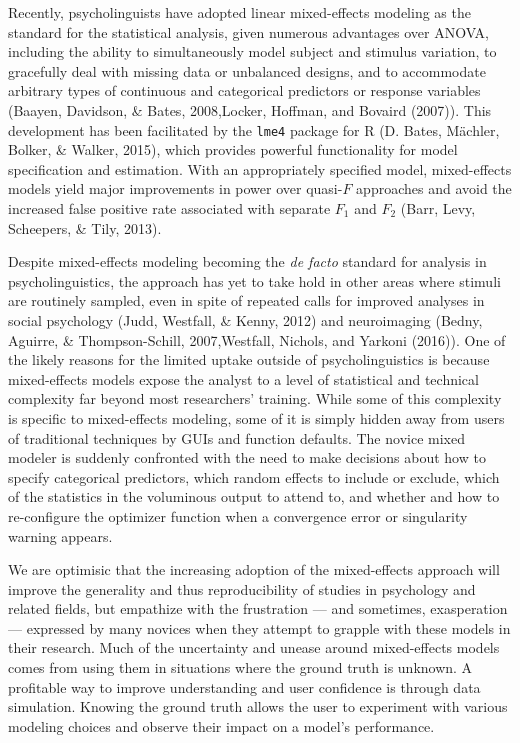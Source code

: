 \documentclass[man,floatsintext]{apa6}
\begin{document}
Recently, psycholinguists have adopted linear mixed-effects modeling as
the standard for the statistical analysis, given numerous advantages
over ANOVA, including the ability to simultaneously model subject and
stimulus variation, to gracefully deal with missing data or unbalanced
designs, and to accommodate arbitrary types of continuous and
categorical predictors or response variables (Baayen, Davidson, \&
Bates, 2008,Locker, Hoffman, and Bovaird (2007)). This development has
been facilitated by the \texttt{lme4} package for R (D. Bates, Mächler,
Bolker, \& Walker, 2015), which provides powerful functionality for
model specification and estimation. With an appropriately specified
model, mixed-effects models yield major improvements in power over
quasi-\(F\) approaches and avoid the increased false positive rate
associated with separate \(F_1\) and \(F_2\) (Barr, Levy, Scheepers, \&
Tily, 2013).

Despite mixed-effects modeling becoming the \emph{de facto} standard for
analysis in psycholinguistics, the approach has yet to take hold in
other areas where stimuli are routinely sampled, even in spite of
repeated calls for improved analyses in social psychology (Judd,
Westfall, \& Kenny, 2012) and neuroimaging (Bedny, Aguirre, \&
Thompson-Schill, 2007,Westfall, Nichols, and Yarkoni (2016)). One of the
likely reasons for the limited uptake outside of psycholinguistics is
because mixed-effects models expose the analyst to a level of
statistical and technical complexity far beyond most researchers'
training. While some of this complexity is specific to mixed-effects
modeling, some of it is simply hidden away from users of traditional
techniques by GUIs and function defaults. The novice mixed modeler is
suddenly confronted with the need to make decisions about how to specify
categorical predictors, which random effects to include or exclude,
which of the statistics in the voluminous output to attend to, and
whether and how to re-configure the optimizer function when a
convergence error or singularity warning appears.

We are optimisic that the increasing adoption of the mixed-effects
approach will improve the generality and thus reproducibility of studies
in psychology and related fields, but empathize with the frustration ---
and sometimes, exasperation --- expressed by many novices when they
attempt to grapple with these models in their research. Much of the
uncertainty and unease around mixed-effects models comes from using them
in situations where the ground truth is unknown. A profitable way to
improve understanding and user confidence is through data simulation.
Knowing the ground truth allows the user to experiment with various
modeling choices and observe their impact on a model's performance.
\end{document}
